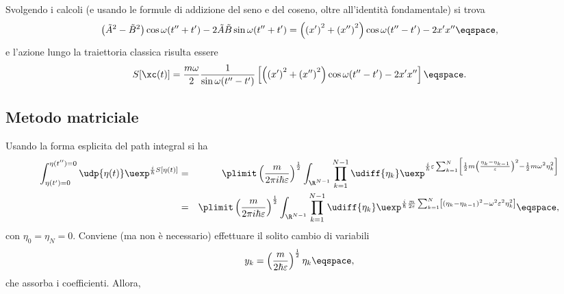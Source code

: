 Svolgendo i calcoli (e usando le formule di addizione del seno e del coseno,
oltre all'identit\`a fondamentale) si trova
\begin{displaymath}
\left( \tilde{A}^{2} - \tilde{B}^{2} \right) \cos \omega (t''+t') -2 \tilde{A}
\tilde{B} \sin \omega (t''+t') =  \left( \left( x'\right)^{2} + \left(
x''\right)^{2} \right) \cos \omega (t'' -t') -2 x'x'' \eqspace ,
\end{displaymath}
e l'azione lungo la traiettoria classica risulta essere
\begin{displaymath}
S[\xc(t)] = \frac{m\omega}{2} \frac{1}{\sin \omega(t''-t')} \left[ 
\left( \left( x'\right)^{2} + \left( x''\right)^{2} \right) \cos \omega (t''-t')
- 2x'x'' \right] \eqspace .
\end{displaymath}
\subsection{Metodo matriciale}
Usando la forma esplicita del path integral si ha
\begin{eqnarray*}
\int_{\eta(t') = 0}^{\eta(t'') = 0} \udp{\eta(t)} \uexp^{\frac{i}{\hbar}
S[\eta(t)]} &=&
\plimit 
\left( \frac{m}{2\pi i \hbar \varepsilon} \right)^{\frac{1}{2}} \int_{\R^{N-1}}
\prod_{k=1}^{N-1} \udiff{\eta_{k}} 
\uexp^{ \frac{i}{\hbar} \varepsilon \sum_{k=1}^{N} \left[
\frac{1}{2} m \left(  \frac{\eta_{k} - \eta_{k-1}}{\varepsilon} \right)^{2} -
\frac{1}{2} m \omega^{2} \eta_{k}^{2} \right]} \\
&=& \plimit 
\left( \frac{m}{2\pi i \hbar \varepsilon} \right)^{\frac{1}{2}} \int_{\R^{N-1}}
\prod_{k=1}^{N-1} \udiff{\eta_{k}} 
\uexp^{ \frac{i}{\hbar} \frac{m}{2\varepsilon} \sum_{k=1}^{N} \left[ \left(
\eta_{k} - \eta_{k-1} \right)^{2} - \omega^{2} \varepsilon^{2} \eta_{k}^{2}
\right]} \eqspace ,
\end{eqnarray*}
con $\eta_{0} = \eta_{N} = 0$.
Conviene (ma non \`e necessario) effettuare il solito cambio di variabili
\begin{displaymath}
y_{k} =   \left( \frac{m}{2\hbar \varepsilon} \right)^{\frac{1}{2}} \eta_{k}
\eqspace ,
\end{displaymath}
che assorba i coefficienti.
Allora,
